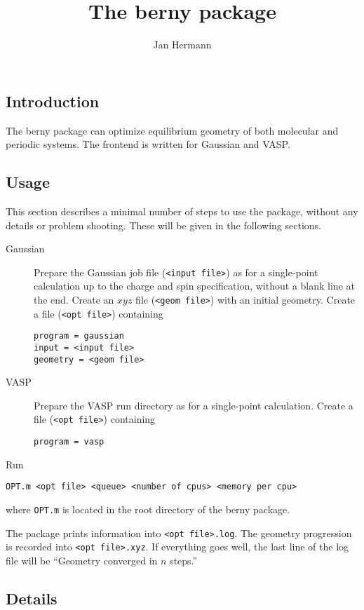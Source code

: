 \documentclass[12pt,a4]{article}
\title{The \textsf{berny} package}
\author{Jan Hermann}
\newcommand{\ttt}{\texttt}
\begin{document}
\date{}

\maketitle 

\subsection{Introduction}

The \textsf{berny} package can optimize equilibrium geometry of both molecular and periodic systems. The frontend is written for Gaussian and VASP.

\subsection{Usage}

This section describes a minimal number of steps to use the package, without any details or problem shooting. These will be given in the following sections.

\begin{description}
\item[Gaussian] Prepare the Gaussian job file (\ttt{<input file>}) as for a single-point calculation up to the charge and spin specification, without a blank line at the end. Create an $xyz$ file (\ttt{<geom file>}) with an initial geometry. Create a file (\ttt{<opt file>}) containing
\begin{verbatim}
program = gaussian
input = <input file>
geometry = <geom file>
\end{verbatim}
\item[VASP] Prepare the VASP run directory as for a single-point calculation. Create a file (\ttt{<opt file>}) containing
\begin{verbatim}
program = vasp
\end{verbatim}
\end{description}
Run
\begin{verbatim}
OPT.m <opt file> <queue> <number of cpus> <memory per cpu>
\end{verbatim}
where \ttt{OPT.m} is located in the root directory of the \textsf{berny} package.

The package prints information into \ttt{<opt file>.log}. The geometry progression is recorded into \ttt{<opt file>.xyz}. If everything goes well, the last line of the log file will be ``Geometry converged in $n$ steps.''

\subsection{Details}
\end{document}
